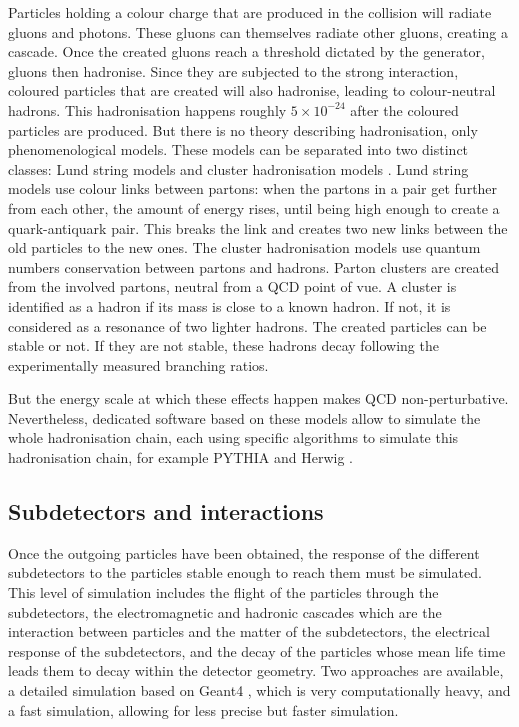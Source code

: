Particles holding a colour charge that are produced in the collision will radiate gluons and photons. These gluons can themselves radiate other gluons, creating a cascade. Once the created gluons reach a threshold dictated by the generator, gluons then hadronise. Since they are subjected to the strong interaction, coloured particles that are created will also hadronise, leading to colour-neutral hadrons. This hadronisation happens roughly $5 \times 10^{-24}$ after the coloured particles are produced. But there is no theory describing hadronisation, only phenomenological models. These models can be separated into two distinct classes: Lund string models \cite{1983PhR....97...31A} and cluster hadronisation models \cite{Winter2004}. Lund string models use colour links between partons: when the partons in a pair get further from each other, the amount of energy rises, until being high enough to create a quark-antiquark pair. This breaks the link and creates two new links between the old particles to the new ones. The cluster hadronisation models use quantum numbers conservation between partons and hadrons. Parton clusters are created from the involved partons, neutral from a QCD point of vue. A cluster is identified as a hadron if its mass is close to a known hadron. If not, it is considered as a resonance of two lighter hadrons. The created particles can be stable or not. If they are not stable, these hadrons decay following the experimentally measured branching ratios.

But the energy scale at which these effects happen makes QCD non-perturbative. Nevertheless, dedicated software based on these models allow to simulate the whole hadronisation chain, each using specific algorithms to simulate this hadronisation chain, for example PYTHIA \cite{SJOSTRAND2008852} and Herwig \cite{Bellm2016}.

\subsection{Subdetectors and interactions}

Once the outgoing particles have been obtained, the response of the different subdetectors to the particles stable enough to reach them must be simulated. This level of simulation includes the flight of the particles through the subdetectors, the electromagnetic and hadronic cascades which are the interaction between particles and the matter of the subdetectors, the electrical response of the subdetectors, and the decay of the particles whose mean life time leads them to decay within the detector geometry. Two approaches are available, a detailed simulation based on Geant4 \cite{AGOSTINELLI2003250}, which is very computationally heavy, and a fast simulation, allowing for less precise but faster simulation.

